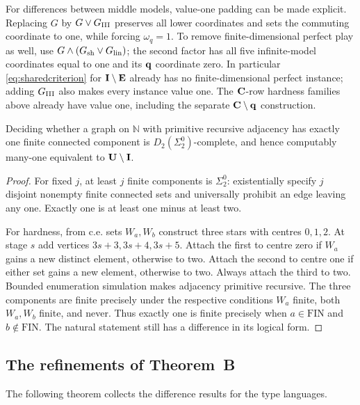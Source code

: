 For differences between middle models, value-one padding can be made explicit. Replacing $G$ by $G\vee G_{\mathrm{III}}$ preserves all lower coordinates and sets the commuting coordinate to one, while forcing $\omega_q=1$. To remove finite-dimensional perfect play as well, use $G\wedge(G_{\rm sh}\vee G_{\rm lin})$; the second factor has all five infinite-model coordinates equal to one and its $\mathbf q$ coordinate zero. In particular \eqref{eq:sharedcriterion} for $\mathbf I\setminus\mathbf E$ already has no finite-dimensional perfect instance; adding $G_{\mathrm{III}}$ also makes every instance value one. The $\mathbf C$-row hardness families above already have value one, including the separate $\mathbf C\setminus\mathbf q$ construction.


\begin{corollary}\label{cor:onecomponent}
Deciding whether a graph on $\mathbb N$ with primitive recursive
adjacency has exactly one finite connected component is
$D_2(\Sigma^0_2)$-complete, and hence computably many-one equivalent
to $\mathbf U\setminus\mathbf I$.
\end{corollary}
\begin{proof}
For fixed $j$, at least $j$ finite components is $\Sigma^0_2$:
existentially specify $j$ disjoint nonempty finite connected sets and
universally prohibit an edge leaving any one. Exactly one is at least
one minus at least two.

For hardness, from c.e. sets $W_a,W_b$ construct three stars with centres
$0,1,2$. At stage $s$ add vertices $3s+3,3s+4,3s+5$. Attach the first
to centre zero if $W_a$ gains a new distinct element, otherwise to two.
Attach the second to centre one if either set gains a new element,
otherwise to two. Always attach the third to two. Bounded enumeration
simulation makes adjacency primitive recursive. The three components
are finite precisely under the respective conditions
$W_a$ finite, both $W_a,W_b$ finite, and never. Thus exactly one is
finite precisely when $a\in\mathrm{FIN}$ and $b\notin\mathrm{FIN}$.
The natural statement still has a difference in its logical form.
\end{proof}

\subsection{The refinements of Theorem~B}
The following theorem collects the difference results for the type languages.

